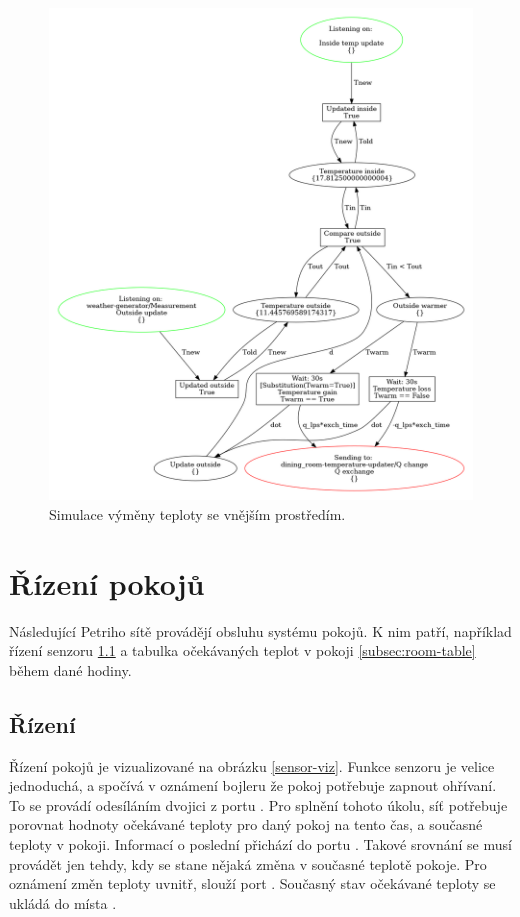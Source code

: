 \begin{figure}[htb]
 \centering
 \includegraphics[width=\textwidth]{obrazky-figures/room-exchange.png}
 \caption{Simulace výměny teploty se vnějším prostředím.}
 \label{exchange-viz}
\end{figure}


\section{Řízení pokojů}
\label{sec:server-details}

Následující Petriho sítě provádějí obsluhu systému pokojů. K nim patří, například řízení senzoru \ref{subsec:room-control} a tabulka očekávaných teplot v pokoji \ref{subsec:room-table} během dané hodiny.

\subsection{Řízení}
\label{subsec:room-control}

Řízení pokojů je vizualizované na obrázku \ref{sensor-viz}. Funkce senzoru je velice jednoduchá, a spočívá v oznámení bojleru že pokoj potřebuje zapnout ohřívaní. To se provádí odesíláním dvojici  z portu . Pro splnění tohoto úkolu, síť potřebuje porovnat hodnoty očekávané teploty pro daný pokoj na tento čas, a současné teploty v pokoji. Informací o poslední přichází do portu . Takové srovnání se musí provádět jen tehdy, kdy se stane nějaká změna v současné teplotě pokoje.  Pro oznámení změn teploty uvnitř, slouží port . Současný stav očekávané teploty se ukládá do místa .

